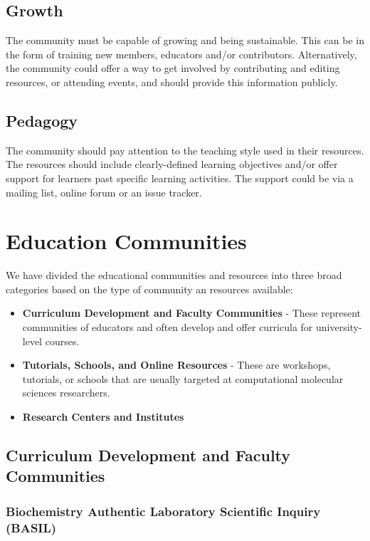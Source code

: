 \documentclass[9pt,review]{livecoms}
\begin{document}
\subsection{Growth} 
The community must be capable of growing and being sustainable. This can be in the form of training new members, educators and/or contributors. Alternatively, the community could offer a way to get involved by contributing and editing resources, or attending events, and should provide this information publicly.
\subsection{Pedagogy}
The community should pay attention to the teaching style used in their resources. The resources should include clearly-defined learning objectives and/or offer support for learners past specific learning activities. The support could be via a mailing list, online forum or an issue tracker.

\section{Education Communities}

We have divided the educational communities and resources into three broad categories based on the type of community an resources available:
\begin{itemize}
    \item \textbf{Curriculum Development and Faculty Communities} - These represent communities of educators and often develop and offer curricula for university-level courses.
    \item \textbf{Tutorials, Schools, and Online Resources} - These are workshops, tutorials, or schools that are usually targeted at computational molecular sciences researchers. 
    \item \textbf{Research Centers and Institutes}
\end{itemize}

\subsection{Curriculum Development and Faculty Communities}

\subsubsection{Biochemistry Authentic Laboratory Scientific Inquiry (BASIL)}

\end{document}
